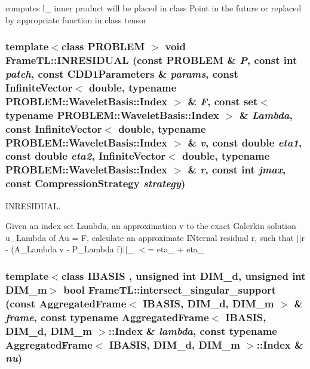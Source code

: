 computes l\_ inner product will be placed in class Point in the future or replaced by appropriate function in class tensor \hypertarget{namespaceFrameTL_cd7462527bff134a7c142ee0471d6ab2}{
\subsubsection[{INRESIDUAL}]{\setlength{\rightskip}{0pt plus 5cm}template$<$class PROBLEM $>$ void FrameTL::INRESIDUAL (const PROBLEM \& {\em P}, \/  const int {\em patch}, \/  const CDD1Parameters \& {\em params}, \/  const InfiniteVector$<$ double, typename PROBLEM::WaveletBasis::Index $>$ \& {\em F}, \/  const set$<$ typename PROBLEM::WaveletBasis::Index $>$ \& {\em Lambda}, \/  const InfiniteVector$<$ double, typename PROBLEM::WaveletBasis::Index $>$ \& {\em v}, \/  const double {\em eta1}, \/  const double {\em eta2}, \/  InfiniteVector$<$ double, typename PROBLEM::WaveletBasis::Index $>$ \& {\em r}, \/  const int {\em jmax}, \/  const CompressionStrategy {\em strategy})}}
\label{namespaceFrameTL_cd7462527bff134a7c142ee0471d6ab2}


INRESIDUAL. 

Given an index set Lambda, an approximation v to the exact Galerkin solution u\_\-Lambda of Au = F, calculate an approximate INternal residual r, such that $|$$|$r - (A\_\-Lambda v - P\_\-Lambda f)$|$$|$\_ $<$= eta\_ + eta\_ \hypertarget{namespaceFrameTL_27f6cca23b933ff76a0597a62f5dd870}{
\subsubsection[{intersect\_\-singular\_\-support}]{\setlength{\rightskip}{0pt plus 5cm}template$<$class IBASIS , unsigned int DIM\_\-d, unsigned int DIM\_\-m$>$ bool FrameTL::intersect\_\-singular\_\-support (const AggregatedFrame$<$ IBASIS, DIM\_\-d, DIM\_\-m $>$ \& {\em frame}, \/  const typename AggregatedFrame$<$ IBASIS, DIM\_\-d, DIM\_\-m $>$::Index \& {\em lambda}, \/  const typename AggregatedFrame$<$ IBASIS, DIM\_\-d, DIM\_\-m $>$::Index \& {\em nu})}}
\label{namespaceFrameTL_27f6cca23b933ff76a0597a62f5dd870}


